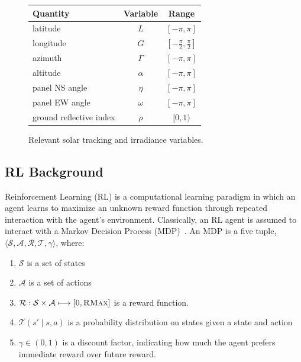 \documentclass{article}
\newcommand{\mc}{\mathcal}
\begin{document}
\begin{figure}
\centering
\begin{tabular}{lcc}
\toprule
Quantity& Variable& Range \\
\midrule
latitude& $L$& $[-\pi, \pi]$ \\
longitude& $G$&  $\left[-\frac{\pi}{2}, \frac{\pi}{2}\right]$\\
azimuth& $\Gamma$& $[-\pi, \pi]$ \\
altitude& $\alpha$& $[-\pi, \pi]$ \\
panel NS angle& $\eta$& $[-\pi, \pi]$ \\
panel EW angle& $\omega$& $[-\pi, \pi]$ \\
ground reflective index& $\rho$& $[0,1)$ \\
\bottomrule
\end{tabular}
\caption{Relevant solar tracking and irradiance variables.}
\end{figure}

\subsection{RL Background}

Reinforcement Learning (RL) is a computational learning paradigm in which an agent learns to maximize an unknown reward function through repeated interaction with the agent's environment. Classically, an RL agent is assumed to interact with a Markov Decision Process (MDP)~\cite{puterman2014markov}. An MDP is a five tuple, $\langle \mc{S}, \mc{A}, \mc{R}, \mc{T}, \gamma \rangle$, where:
\begin{enumerate}
\item $\mc{S}$ is a set of states
\item $\mc{A}$ is a set of actions
\item $\mc{R} : \mc{S} \times \mc{A} \longmapsto [0,\textsc{RMax}] $ is a reward function.
\item $\mc{T}(s' \mid s,a)$ is a probability distribution on states given a state and action
\item $\gamma \in (0,1)$ is a discount factor, indicating how much the agent prefers immediate reward over future reward.
\end{enumerate}
\end{document}

